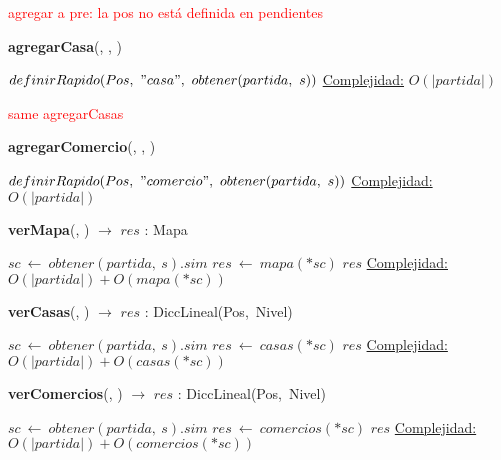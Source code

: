 \begin{Algoritmos}

    \textcolor{red}{agregar a pre: la pos no está definida en pendientes}
    \begin{algorithm}[H]{\textbf{agregarCasa}(, , )} %
    \begin{algorithmic}[1]
        \State $definirRapido(Pos,\ "casa",\ obtener(partida,\ s))$
        \medskip
        \Statex \underline{Complejidad:} $O(|partida|)$
    \end{algorithmic}
    \end{algorithm}
    
    \textcolor{red}{same agregarCasas}
    \begin{algorithm}[H]{\textbf{agregarComercio}(, , )} %
    \begin{algorithmic}[1]
        \State $definirRapido(Pos,\ "comercio",\ obtener(partida,\ s))$ 
        \medskip
        \Statex \underline{Complejidad:} $O(|partida|)$
    \end{algorithmic}
    \end{algorithm}

    \begin{algorithm}[H]{\textbf{verMapa}(, ) $\to$ $res$ : Mapa}
    \begin{algorithmic}[1]
        \State $sc\ \leftarrow\ obtener(partida,\ s).sim$
        \State $res\ \leftarrow\ mapa(*sc)$ 
        \State \Return $res$
        \medskip
        \Statex \underline{Complejidad:} $O(|partida|) + O(mapa(*sc))$
    \end{algorithmic}
    \end{algorithm}
      
    \begin{algorithm}[H]{\textbf{verCasas}(, ) $\to$ $res$ : DiccLineal(Pos,\ Nivel)}
    \begin{algorithmic}[1]
        \State $sc\ \leftarrow\ obtener(partida,\ s).sim$
        \State $res\ \leftarrow\ casas(*sc)$
        \State \Return $res$
        \medskip
        \Statex \underline{Complejidad:} $O(|partida|) + O(casas(*sc))$
    \end{algorithmic}
    \end{algorithm}

    \begin{algorithm}[H]{\textbf{verComercios}(, ) $\to$ $res$ : DiccLineal(Pos,\ Nivel)}
    \begin{algorithmic}[1]
        \State $sc\ \leftarrow\ obtener(partida,\ s).sim$
        \State $res\ \leftarrow\ comercios(*sc)$
        \State \Return $res$
        \medskip
        \Statex \underline{Complejidad:} $O(|partida|) + O(comercios(*sc))$
    \end{algorithmic}
    \end{algorithm}


\end{Algoritmos}
